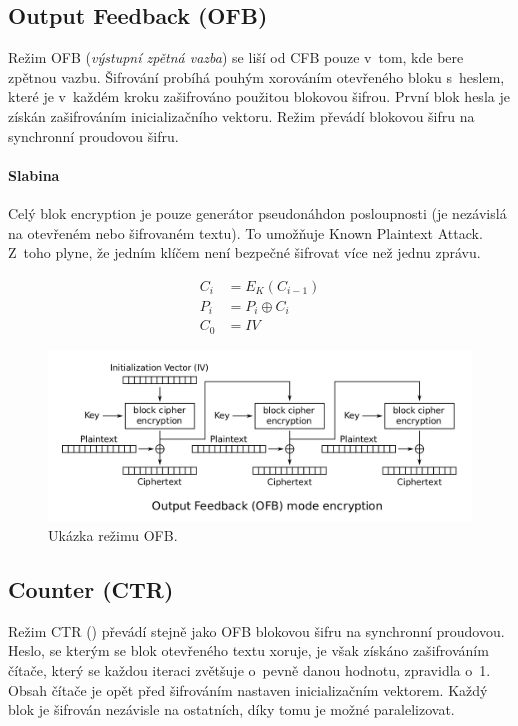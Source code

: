 \subsection{Output Feedback (OFB)}

Režim OFB (\textit{výstupní zpětná vazba}) se liší od CFB pouze v~tom, kde bere zpětnou vazbu. Šifrování probíhá pouhým xorováním otevřeného bloku s~heslem, které je v~každém kroku zašifrováno použitou blokovou šifrou. První blok hesla je získán zašifrováním inicializačního vektoru. Režim převádí blokovou šifru na synchronní proudovou šifru.

\paragraph*{Slabina} Celý blok encryption je pouze generátor pseudonáhdon posloupnosti (je nezávislá na otevřeném nebo šifrovaném textu). To umožňuje Known Plaintext Attack. Z~toho plyne, že jedním klíčem není bezpečné šifrovat více než jednu zprávu.

\begin{equation}
\begin{aligned}
C_i &= E_K (C_{i-1}) \\
P_i &= P_i \oplus C_i \\
C_0 &= IV
\end{aligned}
\end{equation}

\begin{figure}[H]
    \centering
    \includegraphics[width=1\linewidth]{rezim_ofb.png}
    \caption{Ukázka režimu OFB.}
\end{figure}

\subsection{Counter (CTR)}

Režim CTR () převádí stejně jako OFB blokovou šifru na synchronní proudovou. Heslo, se kterým se blok otevřeného textu xoruje, je však získáno zašifrováním čítače, který se každou iteraci zvětšuje o~pevně danou hodnotu, zpravidla o~1. Obsah čítače je opět před šifrováním nastaven inicializačním vektorem. Každý blok je šifrován nezávisle na ostatních, díky tomu je možné paralelizovat.

